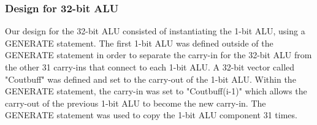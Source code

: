 \documentclass[paper=letter, fontsize=11pt]{scrartcl}
\numberwithin{equation}{section} %
\numberwithin{figure}{section} %
\numberwithin{table}{section} %
\begin{document}
\subsubsection{Design for 32-bit ALU}
\begin{flushleft}
	Our design for the 32-bit ALU consisted of instantiating the 1-bit ALU, using a GENERATE statement. The first 1-bit ALU was defined outside of the GENERATE statement in order to separate the carry-in for the 32-bit ALU from the other 31 carry-ins that connect to each 1-bit ALU. A 32-bit vector called "Coutbuff" was defined and set to the carry-out of the 1-bit ALU. Within the GENERATE statement, the carry-in was set to "Coutbuff(i-1)" which allows the carry-out of the previous 1-bit ALU to become the new carry-in. The GENERATE statement was used to copy the 1-bit ALU component 31 times.  	
\end{flushleft}
\end{document}
